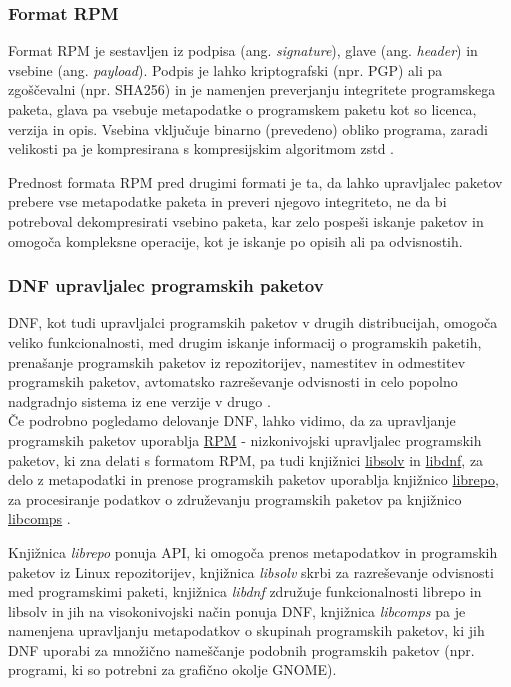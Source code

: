 \subsubsection{Format RPM}

Format RPM je sestavljen iz podpisa (ang. \emph{signature}), glave (ang. \emph{header}) in vsebine
(ang. \emph{payload}).
Podpis je lahko kriptografski (npr. PGP) ali pa zgoščevalni (npr. SHA256) in je namenjen preverjanju integritete
programskega paketa, glava pa vsebuje metapodatke o programskem paketu kot so licenca, verzija in opis.
Vsebina vključuje binarno (prevedeno) obliko programa, zaradi velikosti pa je kompresirana
s kompresijskim algoritmom zstd \cite{fedora-zstd}.

Prednost formata RPM pred drugimi formati je ta, da lahko upravljalec paketov prebere vse metapodatke paketa in preveri
njegovo integriteto, ne da bi potreboval dekompresirati vsebino paketa, kar zelo pospeši iskanje paketov in omogoča
kompleksne operacije, kot je iskanje po opisih ali pa odvisnostih.

\newpage

\subsubsection{DNF upravljalec programskih paketov}

DNF, kot tudi upravljalci programskih paketov v drugih distribucijah, omogoča veliko funkcionalnosti,
med drugim iskanje informacij o programskih paketih, prenašanje programskih paketov iz repozitorijev,
namestitev in odmestitev programskih paketov, avtomatsko razreševanje odvisnosti in celo popolno nadgradnjo sistema
iz ene verzije v drugo \cite{fedora-dnf}.\\

Če podrobno pogledamo delovanje DNF, lahko vidimo, da za upravljanje programskih paketov uporablja
\href{http://rpm.org/}{RPM} - nizkonivojski upravljalec programskih paketov, ki zna delati s formatom RPM,
pa tudi knjižnici \href{https://github.com/openSUSE/libsolv}{libsolv} in
\href{https://github.com/rpm-software-management/libdnf}{libdnf}, za delo z metapodatki in prenose programskih paketov
uporablja knjižnico \href{https://github.com/rpm-software-management/librepo}{librepo}, za procesiranje podatkov o
združevanju programskih paketov pa knjižnico \href{https://github.com/rpm-software-management/libcomps}{libcomps}
\cite{fedora-dnf-git-repo}.

Knjižnica \emph{librepo} ponuja API, ki omogoča prenos metapodatkov in programskih paketov iz Linux repozitorijev,
knjižnica \emph{libsolv} skrbi za razreševanje odvisnosti med programskimi paketi,
knjižnica \emph{libdnf} združuje funkcionalnosti librepo in libsolv in jih na visokonivojski način ponuja DNF,
knjižnica \emph{libcomps} pa je namenjena upravljanju metapodatkov o skupinah programskih paketov, ki jih DNF uporabi
za množično nameščanje podobnih programskih paketov (npr. programi, ki so potrebni za grafično okolje GNOME).

